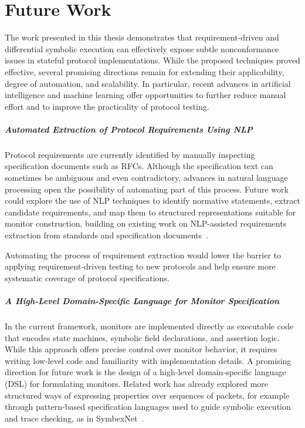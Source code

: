 \chapter{Future Work}\label{chapter:future}
The work presented in this thesis demonstrates that requirement-driven and differential symbolic execution can effectively expose subtle nonconformance issues in stateful protocol implementations.
While the proposed techniques proved effective, several promising directions remain for extending their applicability, degree of automation, and scalability.
In particular, recent advances in artificial intelligence and machine learning offer opportunities to further reduce manual effort and to improve the practicality of protocol testing.

\paragraph{Automated Extraction of Protocol Requirements Using NLP}
Protocol requirements are currently identified by manually inspecting specification documents such as RFCs.
Although the specification text can sometimes be ambiguous and even contradictory, advances in natural language processing open the possibility of automating part of this process.
Future work could explore the use of NLP techniques to identify normative statements, extract candidate requirements, and map them to structured representations suitable for monitor construction, building on existing work on NLP-assisted requirements extraction from standards and specification documents~\cite{Arsenal@16, RCM@22}.

Automating the process of requirement extraction would lower the barrier to applying requirement-driven testing to new protocols and help ensure more systematic coverage of protocol specifications.

\paragraph{A High-Level Domain-Specific Language for Monitor Specification}
In the current framework, monitors are implemented directly as executable code that encodes state machines, symbolic field declarations, and assertion logic.
While this approach offers precise control over monitor behavior, it requires writing low-level code and familiarity with implementation details.
A promising direction for future work is the design of a high-level domain-specific language (DSL) for formulating monitors.
Related work has already explored more structured ways of expressing properties over sequences of packets, for example through pattern-based specification languages used to guide symbolic execution and trace checking, as in SymbexNet~\cite{SymbexNet}.

